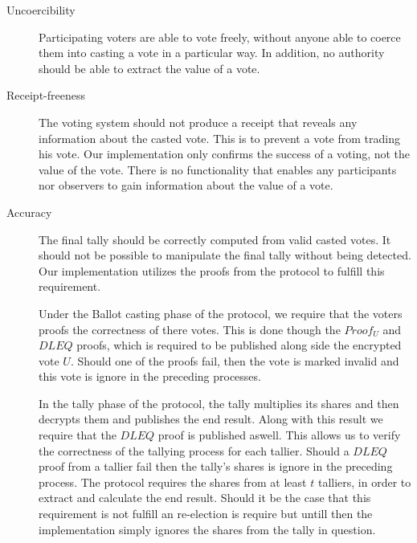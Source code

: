 \begin{description}
        
         
    \item[Uncoercibility]
        Participating voters are able to vote freely, without anyone able to coerce
        them into casting a vote in a particular way. In addition, no authority should be able to extract the value of a vote.
        
    \item[Receipt-freeness]
         The voting system should not produce a receipt that reveals any information about the casted vote. This is to prevent a vote from trading his vote. 
         Our implementation only confirms the success of a voting, not the value of the vote. There is no functionality that enables any participants nor observers to
         gain information about the value of a vote. 
         
        
    \item[Accuracy]
        The final tally should be correctly computed from valid casted votes. It should not be
        possible to manipulate the final tally without being detected. \\
        
        \noindent
        Our implementation utilizes the proofs from the protocol to fulfill this requirement. 
        
        \noindent
        Under the Ballot casting phase of the protocol, we require that the voters proofs the correctness of there votes. This is done though the $Proof_U$ and $DLEQ$ proofs, which is required to be published along side the encrypted vote $U$. Should one of the proofs fail, then the vote is marked invalid and this vote is ignore in the preceding processes. 
        
        \noindent
        In the tally phase of the protocol, the tally multiplies its shares and then decrypts them and publishes the end result. Along with this result we require that the $DLEQ$ proof is published aswell. This allows us to verify the correctness of the tallying process for each tallier. Should a $DLEQ$ proof from a tallier fail then the tally's shares is ignore in the preceding process. The protocol requires the shares from at least $t$ talliers, in order to extract and calculate the end result. Should it 
        be the case that this requirement is not fulfill an re-election is require but untill then the implementation simply ignores the shares from the tally in question.
        

\end{description}
